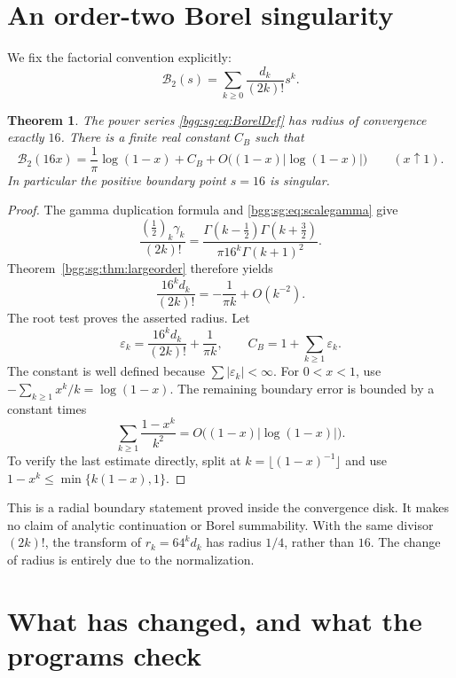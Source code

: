 \documentclass[11pt,a4paper]{article}
\numberwithin{equation}{section}
\newtheorem{theorem}{Theorem}[section]
\theoremstyle{definition}
\theoremstyle{remark}
\theoremstyle{definition}
\begin{document}
\section{An order-two Borel singularity}\label{bgg:sg:sec:borel}

We fix the factorial convention explicitly:
\begin{equation}\label{bgg:sg:eq:BorelDef}
 \mathscr B_2(s)=\sum_{k\ge0}\frac{d_k}{(2k)!}s^k.
\end{equation}

\begin{theorem}\label{bgg:sg:thm:borel}
The power series \eqref{bgg:sg:eq:BorelDef} has radius of convergence exactly
\(16\).  There is a finite real constant \(C_{\!B}\) such that
\begin{equation}\label{bgg:sg:eq:borelboundary}
 \mathscr B_2(16x)
 =\frac1\pi\log(1-x)+C_{\!B}
    +O\bigl((1-x)|\log(1-x)|\bigr)
 \qquad(x\uparrow1).
\end{equation}
In particular the positive boundary point \(s=16\) is singular.
\end{theorem}

\begin{proof}
The gamma duplication formula and \eqref{bgg:sg:eq:scalegamma} give
\[
 \frac{(\tfrac12)_k\gamma_k}{(2k)!}
 =\frac{\Gamma(k-\tfrac12)\Gamma(k+\tfrac32)}
       {\pi16^k\Gamma(k+1)^2}.
\]
Theorem~\ref{bgg:sg:thm:largeorder} therefore yields
\[
 \frac{16^kd_k}{(2k)!}=-\frac1{\pi k}+O(k^{-2}).
\]
The root test proves the asserted radius.  Let
\[
 \varepsilon_k=\frac{16^kd_k}{(2k)!}+\frac1{\pi k},\qquad
 C_{\!B}=1+\sum_{k\ge1}\varepsilon_k.
\]
The constant is well defined because \(\sum|\varepsilon_k|<\infty\).
For \(0<x<1\), use
\(-\sum_{k\ge1}x^k/k=\log(1-x)\).  The remaining boundary error
is bounded by a constant times
\[
 \sum_{k\ge1}\frac{1-x^k}{k^2}
 =O\bigl((1-x)|\log(1-x)|\bigr).
\]
To verify the last estimate directly, split at
\(k=\lfloor(1-x)^{-1}\rfloor\) and use
\(1-x^k\le\min\{k(1-x),1\}\).
\end{proof}

This is a radial boundary statement proved inside the convergence
disk.  It makes no claim of analytic continuation or Borel
summability.  With the same divisor \((2k)!\), the transform of
\(r_k=64^kd_k\) has radius \(1/4\), rather than \(16\).
The change of radius is entirely due to the normalization.

\section{What has changed, and what the programs check}
\label{bgg:sg:sec:changes}
\end{document}
